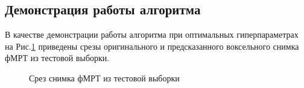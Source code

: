 \documentclass[12pt,twoside]{article}
\begin{document}
\subsection{Демонстрация работы алгоритма}
В качестве демонстрации работы алгоритма при оптимальных гиперпараметрах на Рис.\ref{fig:5} приведены срезы оригинального и предсказанного воксельного снимка фМРТ из тестовой выборки.
\begin{figure}[h!]
    \centering
    \hfill
    \hfill
    \caption{Срез снимка фМРТ из тестовой выборки}
    \label{fig:5}
\end{figure}
\end{document}
